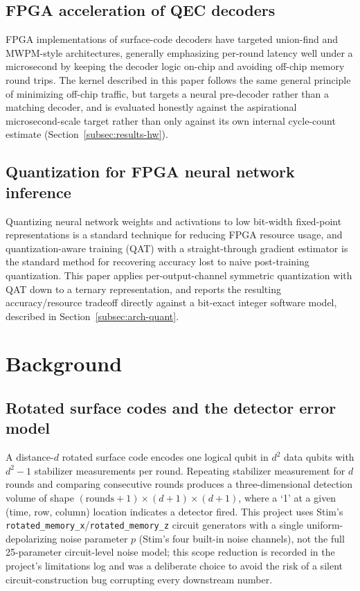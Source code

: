 \documentclass[pdflatex,sn-basic]{sn-jnl}
\begin{document}
\subsection{FPGA acceleration of QEC decoders}\label{subsec:rel-fpga}
FPGA implementations of surface-code decoders have targeted union-find \cite{das2022afs} and MWPM-style architectures, generally emphasizing per-round latency well under a microsecond by keeping the decoder logic on-chip and avoiding off-chip memory round trips. The kernel described in this paper follows the same general principle of minimizing off-chip traffic, but targets a neural pre-decoder rather than a matching decoder, and is evaluated honestly against the aspirational microsecond-scale target rather than only against its own internal cycle-count estimate (Section~\ref{subsec:results-hw}).

\subsection{Quantization for FPGA neural network inference}\label{subsec:rel-quant}
Quantizing neural network weights and activations to low bit-width fixed-point representations is a standard technique for reducing FPGA resource usage, and quantization-aware training (QAT) with a straight-through gradient estimator \cite{bengio2013ste} is the standard method for recovering accuracy lost to naive post-training quantization. This paper applies per-output-channel symmetric quantization with QAT down to a ternary representation, and reports the resulting accuracy/resource tradeoff directly against a bit-exact integer software model, described in Section~\ref{subsec:arch-quant}.

\section{Background}\label{sec:background}

\subsection{Rotated surface codes and the detector error model}\label{subsec:back-rotated}
A distance-\(d\) rotated surface code encodes one logical qubit in \(d^2\) data qubits with \(d^2-1\) stabilizer measurements per round. Repeating stabilizer measurement for \(d\) rounds and comparing consecutive rounds produces a three-dimensional detection volume of shape \((\text{rounds}+1) \times (d+1) \times (d+1)\), where a `1' at a given (time, row, column) location indicates a detector fired. This project uses Stim's \texttt{rotated\_memory\_x}/\texttt{rotated\_memory\_z} circuit generators with a single uniform-depolarizing noise parameter \(p\) (Stim's four built-in noise channels), not the full 25-parameter circuit-level noise model; this scope reduction is recorded in the project's limitations log and was a deliberate choice to avoid the risk of a silent circuit-construction bug corrupting every downstream number.
\end{document}
